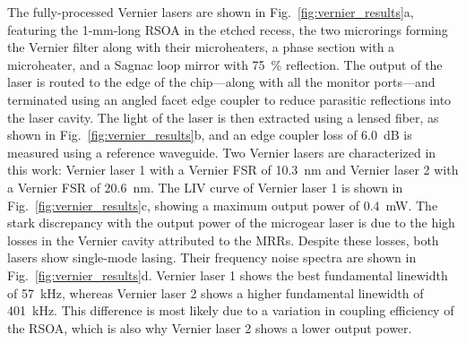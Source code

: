 \documentclass[%
 reprint,
 amsmath,amssymb,
 aps,
]{revtex4-2}
\begin{document}
The fully-processed Vernier lasers are shown in Fig.~\ref{fig:vernier_results}a, featuring the 1-mm-long RSOA in the etched recess, the two microrings forming the Vernier filter along with their microheaters, a phase section with a microheater, and a Sagnac loop mirror with 75~\% reflection. The output of the laser is routed to the edge of the chip---along with all the monitor ports---and terminated using an angled facet edge coupler to reduce parasitic reflections into the laser cavity. The light of the laser is then extracted using a lensed fiber, as shown in Fig.~\ref{fig:vernier_results}b, and an edge coupler loss of 6.0~dB is measured using a reference waveguide. Two Vernier lasers are characterized in this work: Vernier laser 1 with a Vernier FSR of 10.3~nm and Vernier laser 2 with a Vernier FSR of 20.6~nm. The LIV curve of Vernier laser 1 is shown in Fig.~\ref{fig:vernier_results}c, showing a maximum output power of 0.4~mW. The stark discrepancy with the output power of the microgear laser is due to the high losses in the Vernier cavity attributed to the MRRs. Despite these losses, both lasers show single-mode lasing. Their frequency noise spectra are shown in Fig.~\ref{fig:vernier_results}d. Vernier laser 1 shows the best fundamental linewidth of 57~kHz, whereas Vernier laser 2 shows a higher fundamental linewidth of 401~kHz. This difference is most likely due to a variation in coupling efficiency of the RSOA, which is also why Vernier laser 2 shows a lower output power.
\end{document}
